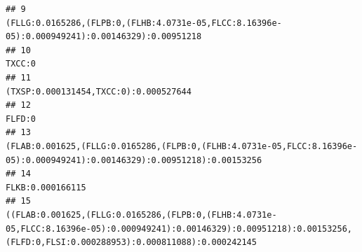 \documentclass[]{article}
\begin{document}
\begin{verbatim}
## 9                                                                                                                                                                                                                                                                                                                                              (FLLG:0.0165286,(FLPB:0,(FLHB:4.0731e-05,FLCC:8.16396e-05):0.000949241):0.00146329):0.00951218
## 10                                                                                                                                                                                                                                                                                                                                                                                                                                     TXCC:0
## 11                                                                                                                                                                                                                                                                                                                                                                                                      (TXSP:0.000131454,TXCC:0):0.000527644
## 12                                                                                                                                                                                                                                                                                                                                                                                                                                     FLFD:0
## 13                                                                                                                                                                                                                                                                                                                  (FLAB:0.001625,(FLLG:0.0165286,(FLPB:0,(FLHB:4.0731e-05,FLCC:8.16396e-05):0.000949241):0.00146329):0.00951218):0.00153256
## 14                                                                                                                                                                                                                                                                                                                                                                                                                           FLKB:0.000166115
## 15                                                                                                                                                                                                                                                              ((FLAB:0.001625,(FLLG:0.0165286,(FLPB:0,(FLHB:4.0731e-05,FLCC:8.16396e-05):0.000949241):0.00146329):0.00951218):0.00153256,(FLFD:0,FLSI:0.000288953):0.000811088):0.000242145

\end{verbatim}
\end{document}
